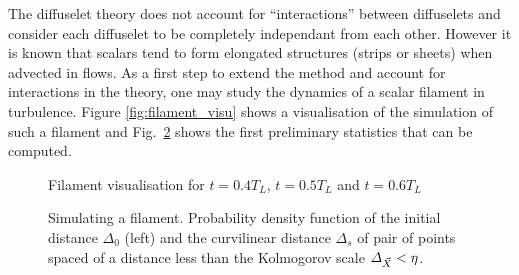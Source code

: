 The diffuselet theory does not account for ``interactions'' between diffuselets and consider each diffuselet to be completely independant from each other.
However it is known that scalars tend to form elongated structures (strips or sheets) when advected in flows.
As a first step to extend the method and account for interactions in the theory, one may study the dynamics of a scalar filament in turbulence.
Figure \ref{fig:filament_visu} shows a visualisation of the simulation of such a filament and Fig.~\ref{fig:filament_stats} shows the first preliminary statistics that can be computed.
\begin{figure}
	\caption{Filament visualisation for $t = 0.4 T_L$, $t = 0.5 T_L$ and $t = 0.6 T_L$}
	\label{fig:filament_stats}
\end{figure}
\begin{figure}
    \centering
    
    \caption{
		Simulating a filament. Probability density function of the initial distance $\varDelta_0$ (left) and the curvilinear distance $\varDelta_s$ of pair of points spaced of a distance less than the Kolmogorov scale $\varDelta_{\vec{X}} < \eta$.
    }
    \label{fig:filament_stats}
\end{figure}
